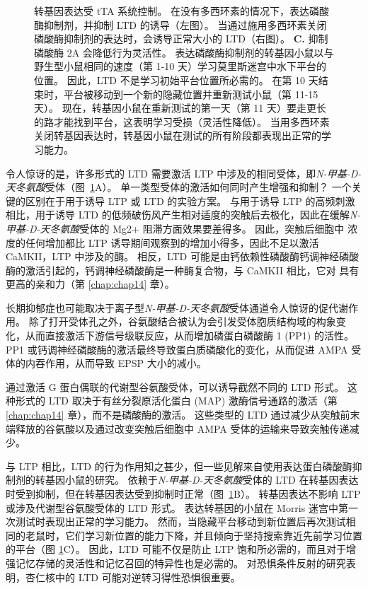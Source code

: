 \begin{figure}[htbp]
{		转基因表达受 tTA 系统控制。
		在没有多西环素的情况下，表达磷酸酶抑制剂，并抑制 LTD 的诱导（左图）。
		当通过施用多西环素关闭磷酸酶抑制剂的表达时，会诱导正常大小的 LTD（右图）。
		\textbf{C.} 抑制磷酸酶 2A 会降低行为灵活性。
		表达磷酸酶抑制剂的转基因小鼠以与野生型小鼠相同的速度（第 1-10 天）学习莫里斯迷宫中水下平台的位置。
		因此，LTD 不是学习初始平台位置所必需的。
		在第 10 天结束时，平台被移动到一个新的隐藏位置并重新测试小鼠（第 11-15 天）。
		现在，转基因小鼠在重新测试的第一天（第 11 天）要走更长的路才能找到平台，这表明学习受损（灵活性降低）。
		当用多西环素关闭转基因表达时，转基因小鼠在测试的所有阶段都表现出正常的学习能力\cite{nicholls2008transgenic}。}
	\label{fig:54_10}
\end{figure}


令人惊讶的是，许多形式的 LTD 需要激活 LTP 中涉及的相同受体，即\textit{N-甲基-D-天冬氨酸}受体（图~\ref{fig:54_10}A）。
单一类型受体的激活如何同时产生增强和抑制？
一个关键的区别在于用于诱导 LTP 或 LTD 的实验方案。
与用于诱导 LTP 的高频刺激相比，用于诱导 LTD 的低频破伤风产生相对适度的突触后去极化，因此在缓解\textit{N-甲基-D-天冬氨酸}受体的 Mg2+ 阻滞方面效果要差得多。
因此，突触后细胞中  浓度的任何增加都比 LTP 诱导期间观察到的增加小得多，因此不足以激活 CaMKII，LTP 中涉及的酶。
相反，LTD 可能是由钙依赖性磷酸酶钙调神经磷酸酶的激活引起的，钙调神经磷酸酶是一种酶复合物，与 CaMKII 相比，它对  具有更高的亲和力（第 \ref{chap:chap14} 章）。


长期抑郁症也可能取决于离子型\textit{N-甲基-D-天冬氨酸}受体通道令人惊讶的促代谢作用。
除了打开受体孔之外，谷氨酸结合被认为会引发受体胞质结构域的构象变化，从而直接激活下游信号级联反应，从而增加磷蛋白磷酸酶 1 (PP1) 的活性。
PP1 或钙调神经磷酸酶的激活最终导致蛋白质磷酸化的变化，从而促进 AMPA 受体的内吞作用，从而导致 EPSP 大小的减小。


通过激活 G 蛋白偶联的代谢型谷氨酸受体，可以诱导截然不同的 LTD 形式。
这种形式的 LTD 取决于有丝分裂原活化蛋白 (MAP) 激酶信号通路的激活（第 \ref{chap:chap14} 章），而不是磷酸酶的激活。
这些类型的 LTD 通过减少从突触前末端释放的谷氨酸以及通过改变突触后细胞中 AMPA 受体的运输来导致突触传递减少。


与 LTP 相比，LTD 的行为作用知之甚少，但一些见解来自使用表达蛋白磷酸酶抑制剂的转基因小鼠的研究。
依赖于\textit{N-甲基-D-天冬氨酸}受体的 LTD 在转基因表达时受到抑制，但在转基因表达受到抑制时正常（图~\ref{fig:54_10}B）。
转基因表达不影响 LTP 或涉及代谢型谷氨酸受体的 LTD 形式。
表达转基因的小鼠在 Morris 迷宫中第一次测试时表现出正常的学习能力。
然而，当隐藏平台移动到新位置后再次测试相同的老鼠时，它们学习新位置的能力下降，并且倾向于坚持搜索靠近先前学习位置的平台（图 \ref{fig:54_10}C）。
因此，LTD 可能不仅是防止 LTP 饱和所必需的，而且对于增强记忆存储的灵活性和记忆召回的特异性也是必需的。
对恐惧条件反射的研究表明，杏仁核中的 LTD 可能对逆转习得性恐惧很重要。



